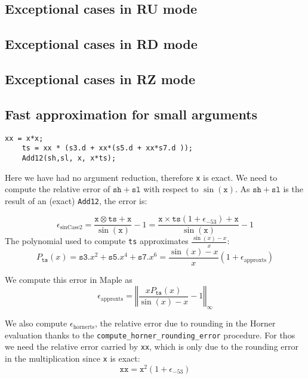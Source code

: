 \subsection{Exceptional cases in RU mode}
\subsection{Exceptional cases in RD mode}
\subsection{Exceptional cases in RZ mode}
\subsection{Fast approximation for small arguments}

\begin{lstlisting}[caption={Sine, case 2},firstnumber=1]
    xx = x*x;
    ts = xx * (s3.d + xx*(s5.d + xx*s7.d ));
    Add12(sh,sl, x, x*ts);
\end{lstlisting}

Here we have had no argument reduction, therefore \texttt{x} is exact.
We need to compute the relative error of $\mathtt{sh}+\mathtt{sl}$
with respect to $\sin(\mathtt{x})$. As $\mathtt{sh}+\mathtt{sl}$ is
the result of an (exact) \texttt{Add12}, the error is:

\begin{equation}
  \epsilon_{\mathrm{sinCase2}} = \frac{\mathtt{x}\otimes \mathtt{ts} + \mathtt{x}}{\sin(\mathtt{x})} -1 = \frac{\mathtt{x}\times\mathtt{ts}(1+\epsilon_{-53}) + \mathtt{x}}{\sin(\mathtt{x})} -1
\label{eq:SinCase2Total}
\end{equation}
The polynomial used to compute \texttt{ts}
approximates $\frac{\sin(x)-x}{x}$: 
$$
P_{\mathtt{ts}}(x) = \mathtt{s3}.x^2 + \mathtt{s5}.x^4 + \mathtt{s7}.x^6
= \frac{\sin(x)-x}{x}(1+\epsilon_{\mathrm{approxts}})
$$

We compute this error in Maple as 
$$\epsilon_{\mathrm{approxts}} = \left\Vert \frac{xP_{\mathtt{ts}}(x)}{\sin(x)-x} -1 \right\Vert_{\infty}$$

We also compute $\epsilon_{\mathrm{hornerts}}$, the relative error due
to rounding in the Horner evaluation thanks to the
\texttt{compute\_horner\_rounding\_error} procedure. For thos we need
the relative error carried by \texttt{xx}, which is only due to the
rounding error in the multiplication since \texttt{x} is exact:
$$\mathtt{xx}=\mathtt{x}^2(1+\epsilon_{-53})$$

